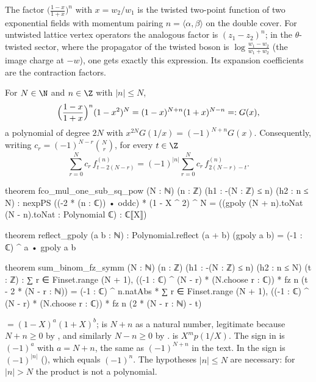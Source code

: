 \begin{physics}
The factor $\bigl(\frac{1-x}{1+x}\bigr)^n$ with $x=w_2/w_1$ is the twisted two-point function of two exponential fields with momentum pairing $n=\langle\alpha,\beta\rangle$ on the double cover. For untwisted lattice vertex operators the analogous factor is $(z_1-z_2)^{n}$; in the $\theta$-twisted sector, where the propagator of the twisted boson is $\log\frac{w_1-w_2}{w_1+w_2}$ (the image charge at $-w$), one gets exactly this expression. Its expansion coefficients are the contraction factors.
\end{physics}

\begin{theorem}\label{ch08:thm:fco}
For $N\in\N$ and $n\in\Z$ with $|n|\le N$,
\begin{equation*}
  \Bigl(\frac{1-x}{1+x}\Bigr)^n(1-x^2)^N=(1-x)^{N+n}(1+x)^{N-n}=:G(x),
\end{equation*}
a polynomial of degree $2N$ with $x^{2N}G(1/x)=(-1)^{N+n}G(x)$.  Consequently, writing
$c_r=(-1)^{N-r}\binom Nr$, for every $t\in\Z$
\begin{equation}\label{ch08:eq:palin}
  \sum_{r=0}^Nc_r\,f^{(n)}_{t-2(N-r)}=(-1)^{|n|}\sum_{r=0}^Nc_r\,f^{(n)}_{2(N-r)-t}.
\end{equation}
\end{theorem}
\begin{leancode}
theorem fco_mul_one_sub_sq_pow (N : ℕ) (n : ℤ) (h1 : -(N : ℤ) ≤ n) (h2 : n ≤ N) :
    nexpPS ((-2 * (n : ℂ)) • oddc) * (1 - X ^ 2) ^ N
      = ((gpoly (N + n).toNat (N - n).toNat : Polynomial ℂ) : ℂ⟦X⟧)

theorem reflect_gpoly (a b : ℕ) :
    Polynomial.reflect (a + b) (gpoly a b) = (-1 : ℂ) ^ a • gpoly a b

theorem sum_binom_fz_symm (N : ℕ) (n : ℤ) (h1 : -(N : ℤ) ≤ n) (h2 : n ≤ N) (t : ℤ) :
    ∑ r ∈ Finset.range (N + 1), ((-1 : ℂ) ^ (N - r) * (N.choose r : ℂ)) * fz n (t - 2 * (N - r : ℕ))
      = (-1 : ℂ) ^ n.natAbs *
        ∑ r ∈ Finset.range (N + 1), ((-1 : ℂ) ^ (N - r) * (N.choose r : ℂ)) *
          fz n (2 * (N - r : ℕ) - t)
\end{leancode}
\begin{dictionary}
 $=(1-X)^a(1+X)^b$;  is $N+n$ as a natural number, legitimate
because $N+n\ge0$ by , and similarly $N-n\ge0$ by .  
is $X^mp(1/X)$.  The sign in  is $(-1)^a$ with $a=N+n$, the same as
$(-1)^{N+n}$ in the text.  In  the sign is $(-1)^{|n|}$
(), which equals $(-1)^n$.  The hypotheses $|n|\le N$ are necessary: for $|n|>N$
the product is not a polynomial.
\end{dictionary}

